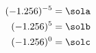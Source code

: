 \[
\begin{aligned}
(-1.256)^{-5}&=\sola
\\
(-1.256)^{5}&=\solb
\\
(-1.256)^{0}&=\solc
\end{aligned}
\]
